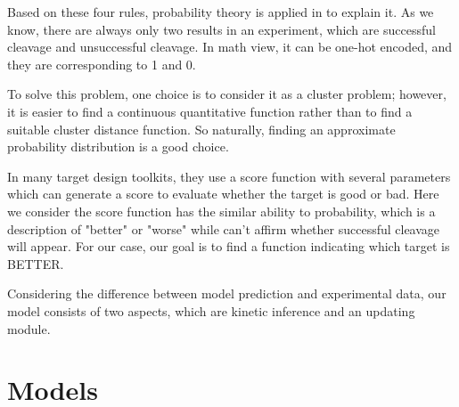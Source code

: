 \documentclass[a4paper,10pt]{article}
\begin{document}
	Based on these four rules, probability theory is applied in to explain it. As we know, there are always only two results in an experiment, which are successful cleavage and unsuccessful cleavage. In math view, it can be one-hot encoded, and they are corresponding to 1 and 0. 
	
	To solve this problem, one choice is to consider it as a cluster problem; however, it is easier to find a continuous quantitative function rather than to find a suitable cluster distance function. So naturally, finding an approximate probability distribution is a good choice. 
	
	In many target design toolkits, they use a score function with several parameters which can generate a score to evaluate whether the target is good or bad. Here we consider the score function has the similar ability to probability, which is a description of "better" or "worse" while can’t affirm whether successful cleavage will appear. For our case, our goal is to find a function indicating which target is BETTER.
	
	Considering the difference between model prediction and experimental data, our model consists of two aspects, which are kinetic inference and an updating module.
	
	\section{Models}
\end{document}
